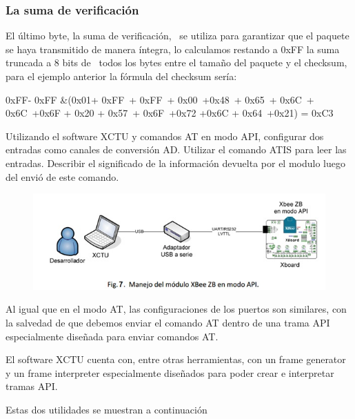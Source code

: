 \documentclass[11pt,oneside,spanish,a4paper]{article}
\begin{document}
\subsubsection{La suma de verificación}
El último byte, la suma de verificación,  se utiliza para garantizar que el paquete se haya transmitido de manera íntegra, lo calculamos restando a 0xFF la suma truncada a 8 bits de  todos los bytes entre el tamaño del paquete y el checksum, para el ejemplo anterior la fórmula del checksum sería:


0xFF- 0xFF \&(0x01+ 0xFF + 0xFF + 0x00 +0x48 +
0x65 + 0x6C + 0x6C +0x6F + 0x20 +
0x57 + 0x6F +0x72 +0x6C + 0x64 +0x21) = 0xC3


Utilizando el software XCTU y comandos AT en modo API, configurar dos entradas como canales de conversión AD. Utilizar el comando ATIS para leer las entradas. Describir el significado de la información devuelta por el modulo luego del envió de este comando.
\begin{figure}[ht]
	\centering
	\includegraphics[width=.6\textwidth]{img/IMAGEN07.jpg}
\end{figure}
Al igual que en el modo AT, las configuraciones de los puertos son similares, con la salvedad de que debemos enviar el comando AT dentro de una trama API especialmente diseñada para enviar comandos AT.

El software XCTU cuenta con, entre otras herramientas, con un frame generator y un frame interpreter especialmente diseñados para poder crear e interpretar tramas API.

Estas dos utilidades se muestran a continuación
\end{document}
